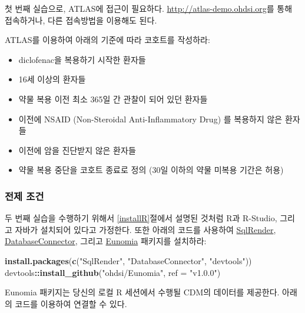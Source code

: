 \documentclass[11pt]{book}
\newenvironment{Shaded}{\begin{snugshade}}{\end{snugshade}}
\newcommand{\KeywordTok}[1]{\textcolor[rgb]{0.13,0.29,0.53}{\textbf{#1}}}
\newcommand{\DataTypeTok}[1]{\textcolor[rgb]{0.13,0.29,0.53}{#1}}
\newcommand{\StringTok}[1]{\textcolor[rgb]{0.31,0.60,0.02}{#1}}
\newcommand{\OperatorTok}[1]{\textcolor[rgb]{0.81,0.36,0.00}{\textbf{#1}}}
\newcommand{\NormalTok}[1]{#1}
\providecommand{\tightlist}{%
  \setlength{\itemsep}{0pt}\setlength{\parskip}{0pt}}
\theoremstyle{definition}
\theoremstyle{definition}
\theoremstyle{definition}
\theoremstyle{remark}
\let\BeginKnitrBlock\begin \let\EndKnitrBlock\end
\begin{document}
첫 번째 실습으로, ATLAS에 접근이 필요하다.
\url{http://atlas-demo.ohdsi.org}를 통해 접속하거나, 다른 접속방법을
이용해도 된다.

\BeginKnitrBlock{exercise}
\protect\hypertarget{exr:exerciseCohortsAtlas}{}{\label{exr:exerciseCohortsAtlas}
}ATLAS를 이용하여 아래의 기준에 따라 코호트를 작성하라:

\begin{itemize}
\tightlist
\item
  diclofenac을 복용하기 시작한 환자들
\item
  16세 이상의 환자들
\item
  약물 복용 이전 최소 365일 간 관찰이 되어 있던 환자들
\item
  이전에 NSAID (Non-Steroidal Anti-Inflammatory Drug) 를 복용하지 않은
  환자들
\item
  이전에 암을 진단받지 않은 환자들
\item
  약물 복용 중단을 코호트 종료로 정의 (30일 이하의 약물 미복용 기간은
  허용)
\end{itemize}
\EndKnitrBlock{exercise}

\subsubsection*{전제 조건}\label{--3}

두 번째 실습을 수행하기 위해서 \ref{installR}절에서 설명된 것처럼 R과
R-Studio, 그리고 자바가 설치되어 있다고 가정한다. 또한 아래의 코드를
사용하여 \href{https://ohdsi.github.io/SqlRender/}{SqlRender},
\href{https://ohdsi.github.io/DatabaseConnector/}{DatabaseConnector},
그리고 \href{https://ohdsi.github.io/Eunomia/}{Eunomia} 패키지를
설치하라:

\begin{Shaded}
\begin{Highlighting}[]
\KeywordTok{install.packages}\NormalTok{(}\KeywordTok{c}\NormalTok{(}\StringTok{"SqlRender"}\NormalTok{, }\StringTok{"DatabaseConnector"}\NormalTok{, }\StringTok{"devtools"}\NormalTok{))}
\NormalTok{devtools}\OperatorTok{::}\KeywordTok{install_github}\NormalTok{(}\StringTok{"ohdsi/Eunomia"}\NormalTok{, }\DataTypeTok{ref =} \StringTok{"v1.0.0"}\NormalTok{)}
\end{Highlighting}
\end{Shaded}

Eunomia 패키지는 당신의 로컬 R 세션에서 수행될 CDM의 데이터를 제공한다.
아래의 코드를 이용하여 연결할 수 있다.
\end{document}
